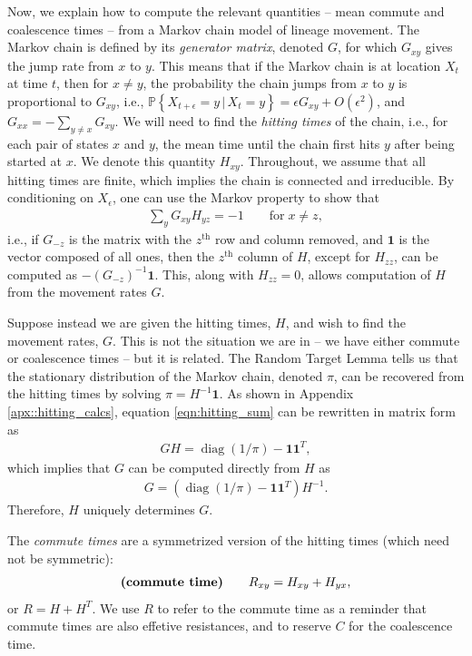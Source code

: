 \documentclass{article}
\DeclareMathOperator{\diag}{\mathop{\mbox{diag}}}
\renewcommand{\P}{\mathbb{P}}
\newcommand{\given}{\,\vert\,}
\newcommand{\PP}[1]{\P\!\left\{#1\right\}}
\newcommand{\bone}{\mathbf{1}}
\begin{document}
Now, we explain how to compute the relevant quantities --
mean commute and coalescence times -- from a Markov chain model of lineage movement.
The Markov chain is defined by its \emph{generator matrix}, denoted $G$,
for which $G_{xy}$ gives the jump rate from $x$ to $y$.
This means that if the Markov chain is at location $X_t$ at time $t$,
then for $x \neq y$, the probability the chain jumps from $x$ to $y$ is proportional to $G_{xy}$,
i.e., $\PP{X_{t+\epsilon} = y \given X_t = y} = \epsilon G_{xy} + O(\epsilon^2)$,
and $G_{xx} = - \sum_{y \neq x} G_{xy}$.
We will need to find the \emph{hitting times} of the chain,
i.e., for each pair of states $x$ and $y$, 
the mean time until the chain first hits $y$ after being started at $x$.
We denote this quantity $H_{xy}$.
Throughout, we assume that all hitting times are finite,
which implies the chain is connected and irreducible.
By conditioning on $X_\epsilon$,
one can use the Markov property to show that
\begin{align} \label{eqn:hitting_sum}
    \sum_y G_{xy} H_{yz} = -1 \qquad \text{for} \; x \neq z,
\end{align}
i.e., if $G_{-z}$ is the matrix with the $z^\text{th}$ row and column removed,
and $\bone$ is the vector composed of all ones,
then the $z^\text{th}$ column of $H$, except for $H_{zz}$,
can be computed as $- (G_{-z})^{-1} \bone$.
This, along with $H_{zz} = 0$, allows computation of $H$
from the movement rates $G$.

Suppose instead we are given the hitting times, $H$, and wish to find the movement rates, $G$.
This is not the situation we are in -- we have either commute or coalescence times --
but it is related.
The Random Target Lemma \citep{aldous}
tells us that the stationary distribution of the Markov chain, denoted $\pi$,
can be recovered from the hitting times by solving $\pi = H^{-1} \bone$.
As shown in Appendix \ref{apx::hitting_calcs},
equation \eqref{eqn:hitting_sum} can be rewritten in matrix form as
\begin{align}
    G H = \diag(1/\pi) - \bone \bone^T ,
\end{align}
which implies that $G$ can be computed directly from $H$ as
\begin{align} \label{eqn:G_from_H}
    G = \left( \diag(1/\pi) - \bone \bone^T \right) H^{-1} .
\end{align}
Therefore, $H$ uniquely determines $G$.

The \emph{commute times} are a symmetrized version of the hitting times
(which need not be symmetric):
\begin{align} \label{eqn:R_from_H}
\text{\bf (commute time)} \qquad
    R_{xy} = H_{xy} + H_{yx},
\end{align}
or $R = H + H^T$.
We use $R$ to refer to the commute time as a reminder that commute times are also effetive resistances,
and to reserve $C$ for the coalescence time.
\end{document}
